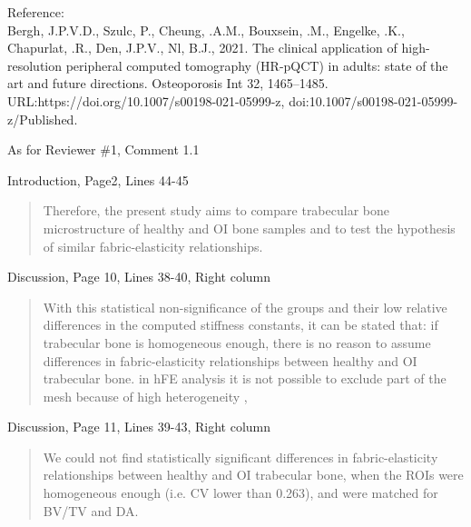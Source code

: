 \documentclass{AR2RC}
\begin{document}
Reference:\\
Bergh, J.P.V.D., Szulc, P., Cheung, .A.M., Bouxsein, .M., Engelke, .K., Chapurlat, .R., Den, J.P.V., Nl, B.J., 2021. The clinical application of high-resolution peripheral computed tomography (HR-pQCT) in adults: state of the art and future directions. Osteoporosis Int 32, 1465–1485. URL:https://doi.org/10.1007/s00198-021-05999-z, doi:10.1007/s00198-021-05999-z/Published.\par

As for Reviewer \#1, Comment 1.1\par

Introduction, Page2, Lines 44-45
\begin{quote}
	Therefore, the present study aims to compare trabecular bone microstructure of healthy and OI bone samples and to test the hypothesis of similar fabric-elasticity relationships.
\end{quote}

Discussion, Page 10, Lines 38-40, Right column
\begin{quote}
	With this statistical non-significance of the groups and their low relative differences in the computed stiffness constants, it can be stated that: if trabecular bone is homogeneous enough, there is no reason to assume differences in fabric-elasticity relationships between healthy and OI trabecular bone.  in hFE analysis  it is not possible to exclude part of the mesh because of high heterogeneity , 
\end{quote}

Discussion, Page 11, Lines 39-43, Right column
\begin{quote}
	We could not find statistically significant differences in fabric-elasticity relationships between healthy and OI trabecular bone, when the ROIs were homogeneous enough  (i.e. CV lower than 0.263), and were matched for BV/TV and DA. 
\end{quote}
\end{document}
